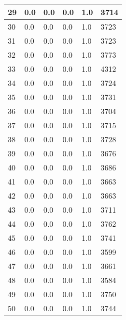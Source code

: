\begin{longtable}{|l|l|l|l|l|l|}
29 & 0.0 & 0.0 & 0.0 & 1.0 & 3714 \\ \hline 
30 & 0.0 & 0.0 & 0.0 & 1.0 & 3723 \\ \hline 
31 & 0.0 & 0.0 & 0.0 & 1.0 & 3723 \\ \hline 
32 & 0.0 & 0.0 & 0.0 & 1.0 & 3773 \\ \hline 
33 & 0.0 & 0.0 & 0.0 & 1.0 & 4312 \\ \hline 
34 & 0.0 & 0.0 & 0.0 & 1.0 & 3724 \\ \hline 
35 & 0.0 & 0.0 & 0.0 & 1.0 & 3731 \\ \hline 
36 & 0.0 & 0.0 & 0.0 & 1.0 & 3704 \\ \hline 
37 & 0.0 & 0.0 & 0.0 & 1.0 & 3715 \\ \hline 
38 & 0.0 & 0.0 & 0.0 & 1.0 & 3728 \\ \hline 
39 & 0.0 & 0.0 & 0.0 & 1.0 & 3676 \\ \hline 
40 & 0.0 & 0.0 & 0.0 & 1.0 & 3686 \\ \hline 
41 & 0.0 & 0.0 & 0.0 & 1.0 & 3663 \\ \hline 
42 & 0.0 & 0.0 & 0.0 & 1.0 & 3663 \\ \hline 
43 & 0.0 & 0.0 & 0.0 & 1.0 & 3711 \\ \hline 
44 & 0.0 & 0.0 & 0.0 & 1.0 & 3762 \\ \hline 
45 & 0.0 & 0.0 & 0.0 & 1.0 & 3741 \\ \hline 
46 & 0.0 & 0.0 & 0.0 & 1.0 & 3599 \\ \hline 
47 & 0.0 & 0.0 & 0.0 & 1.0 & 3661 \\ \hline 
48 & 0.0 & 0.0 & 0.0 & 1.0 & 3584 \\ \hline 
49 & 0.0 & 0.0 & 0.0 & 1.0 & 3750 \\ \hline 
50 & 0.0 & 0.0 & 0.0 & 1.0 & 3744 \\ \hline 
\end{longtable}